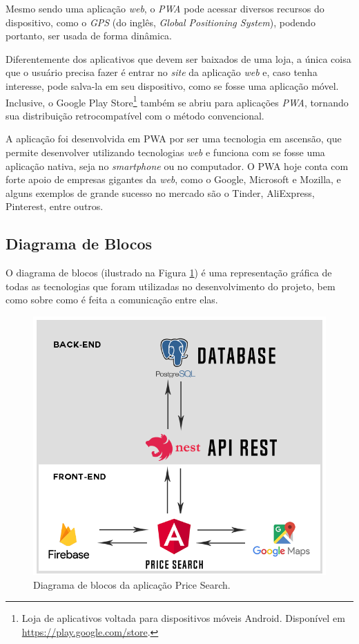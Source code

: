 Mesmo sendo uma aplicação \textit{web}, o \textit{PWA} pode acessar diversos recursos do dispositivo, como o \textit{GPS} (do inglês, \textit{Global Positioning System}), podendo portanto, ser usada de forma dinâmica.

Diferentemente dos aplicativos que devem ser baixados de uma loja, a única coisa que o usuário precisa fazer é entrar no \textit{site} da aplicação \textit{web} e, caso tenha interesse, pode salva-la em seu dispositivo, como se fosse uma aplicação móvel. Inclusive, o Google Play Store\footnote{Loja de aplicativos voltada para dispositivos móveis Android. Disponível em \url{https://play.google.com/store}.} também se abriu para aplicações \textit{PWA}, tornando sua distribuição retrocompatível com o método convencional.

A aplicação foi desenvolvida em PWA por ser uma tecnologia em ascensão, que permite desenvolver utilizando tecnologias \textit{web} e funciona com se fosse uma aplicação nativa, seja no \textit{smartphone} ou no computador. O PWA hoje conta com forte apoio de empresas gigantes da \textit{web}, como o Google, Microsoft e Mozilla, e alguns exemplos de grande sucesso no mercado são o Tinder, AliExpress, Pinterest, entre outros.

\subsection{Diagrama de Blocos}

 O diagrama de blocos (ilustrado na Figura  \ref{fig:diagrama_de_blocos}) é uma representação gráfica de todas as tecnologias que foram utilizadas no desenvolvimento do projeto, bem como sobre como é feita a comunicação entre elas.
 
\begin{figure}[!htb]
\centering
\includegraphics[width=\linewidth]{figuras/diagrama_de_blocos.png}
\caption{Diagrama de blocos da aplicação Price Search.}
\label{fig:diagrama_de_blocos}
\end{figure}
 
